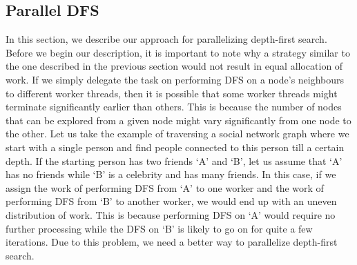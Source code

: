 \subsection{Parallel DFS}
In this section, we describe our approach for parallelizing depth-first search.
Before we begin our description, it is important to note why a strategy similar
to the one described in the previous section would not result in equal
allocation of work. If we simply delegate the task on performing DFS on a node's
neighbours to different worker threads, then it is possible that some worker
threads might terminate significantly earlier than others. This is because the
number of nodes that can be explored from a given node might vary significantly
from one node to the other. Let us take the example of traversing a social
network graph where we start with a single person and find people connected to
this person till a certain depth. If the starting person has two friends `A' and
`B', let us assume that `A' has no friends while `B' is a celebrity and has many
friends. In this case, if we assign the work of performing DFS from `A' to one
worker and the work of performing DFS from `B' to another worker, we would end
up with an uneven distribution of work. This is because performing DFS on `A'
would require no further processing while the DFS on `B' is likely to go on for
quite a few iterations. Due to this problem, we need a better way to parallelize
depth-first search.

